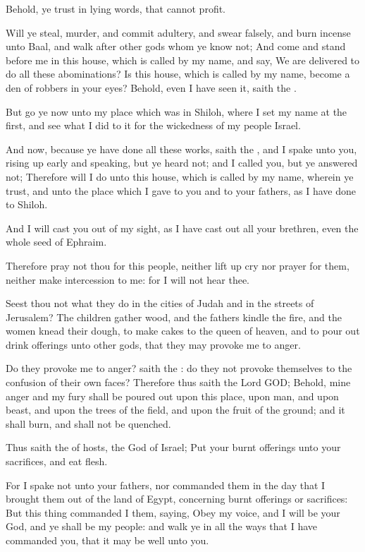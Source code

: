 \verse Behold, ye trust in lying words, that cannot profit.

\verse Will ye steal, murder, and commit adultery, and swear falsely, and burn incense unto Baal, and walk after other gods whom ye know not; \verse And come and stand before me in this house, which is called by my name, and say, We are delivered to do all these abominations?  \verse Is this house, which is called by my name, become a den of robbers in your eyes? Behold, even I have seen it, saith the \LORD.

\verse But go ye now unto my place which was in Shiloh, where I set my name at the first, and see what I did to it for the wickedness of my people Israel.

\verse And now, because ye have done all these works, saith the \LORD, and I spake unto you, rising up early and speaking, but ye heard not; and I called you, but ye answered not; \verse Therefore will I do unto this house, which is called by my name, wherein ye trust, and unto the place which I gave to you and to your fathers, as I have done to Shiloh.

\verse And I will cast you out of my sight, as I have cast out all your brethren, even the whole seed of Ephraim.

\verse Therefore pray not thou for this people, neither lift up cry nor prayer for them, neither make intercession to me: for I will not hear thee.

\verse Seest thou not what they do in the cities of Judah and in the streets of Jerusalem?  \verse The children gather wood, and the fathers kindle the fire, and the women knead their dough, to make cakes to the queen of heaven, and to pour out drink offerings unto other gods, that they may provoke me to anger.

\verse Do they provoke me to anger? saith the \LORD: do they not provoke themselves to the confusion of their own faces?  \verse Therefore thus saith the Lord GOD; Behold, mine anger and my fury shall be poured out upon this place, upon man, and upon beast, and upon the trees of the field, and upon the fruit of the ground; and it shall burn, and shall not be quenched.

\verse Thus saith the \LORD of hosts, the God of Israel; Put your burnt offerings unto your sacrifices, and eat flesh.

\verse For I spake not unto your fathers, nor commanded them in the day that I brought them out of the land of Egypt, concerning burnt offerings or sacrifices: \verse But this thing commanded I them, saying, Obey my voice, and I will be your God, and ye shall be my people: and walk ye in all the ways that I have commanded you, that it may be well unto you.

